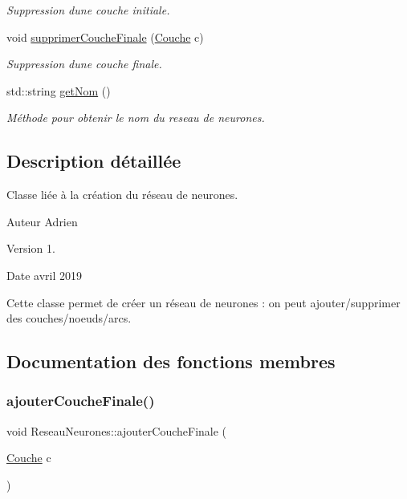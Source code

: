 \begin{DoxyCompactItemize}
\begin{DoxyCompactList}\small\item\em Suppression d\textquotesingle{}une couche initiale. \end{DoxyCompactList}\item 
void \hyperlink{classReseauNeurones_a1451816837d4df8ad486775cc2f9730b}{supprimer\+Couche\+Finale} (\hyperlink{classCouche}{Couche} c)
\begin{DoxyCompactList}\small\item\em Suppression d\textquotesingle{}une couche finale. \end{DoxyCompactList}\item 
std\+::string \hyperlink{classReseauNeurones_a3dff69c97c748171ca5bacfe521e9063}{get\+Nom} ()
\begin{DoxyCompactList}\small\item\em Méthode pour obtenir le nom du reseau de neurones. \end{DoxyCompactList}\end{DoxyCompactItemize}


\subsection{Description détaillée}
Classe liée à la création du réseau de neurones. 

\begin{DoxyAuthor}{Auteur}
Adrien 
\end{DoxyAuthor}
\begin{DoxyVersion}{Version}
1. 
\end{DoxyVersion}
\begin{DoxyDate}{Date}
avril 2019
\end{DoxyDate}
Cette classe permet de créer un réseau de neurones \+: on peut ajouter/supprimer des couches/noeuds/arcs. 

\subsection{Documentation des fonctions membres}
\mbox{\label{classReseauNeurones_a8802f175e367ecd5ab3ad2d4d5b91058}} 
\subsubsection{\texorpdfstring{ajouter\+Couche\+Finale()}{ajouterCoucheFinale()}}
{\footnotesize\ttfamily void Reseau\+Neurones\+::ajouter\+Couche\+Finale (\begin{DoxyParamCaption}\item[{\hyperlink{classCouche}{Couche}}]{c }\end{DoxyParamCaption})}



